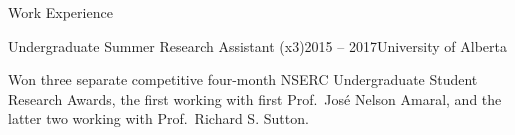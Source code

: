 \documentclass{cv}
\begin{document}
\begin{rSection}{Work Experience}
\clearpage

\begin{rSubsection}{Undergraduate Summer Research Assistant (x3)}{2015 -- 2017}{University of Alberta}
    \item Won three separate competitive four-month NSERC Undergraduate Student Research Awards, the first working with first Prof.\ Jos{\'{e}} Nelson Amaral, and the latter two working with Prof.\ Richard S. Sutton.
\end{rSubsection}

\end{rSection}

\end{document}

